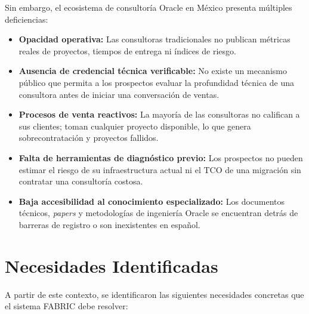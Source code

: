 \documentclass[12pt, a4paper, twoside]{report}
\begin{document}
Sin embargo, el ecosistema de consultoría Oracle en México presenta múltiples deficiencias:

\begin{itemize}
  \item \textbf{Opacidad operativa:} Las consultoras tradicionales no publican métricas reales
        de proyectos, tiempos de entrega ni índices de riesgo.

  \item \textbf{Ausencia de credencial técnica verificable:} No existe un mecanismo público que
        permita a los prospectos evaluar la profundidad técnica de una consultora antes de iniciar
        una conversación de ventas.

  \item \textbf{Procesos de venta reactivos:} La mayoría de las consultoras no califican a sus
        clientes; toman cualquier proyecto disponible, lo que genera sobrecontratación y proyectos
        fallidos.

  \item \textbf{Falta de herramientas de diagnóstico previo:} Los prospectos no pueden estimar
        el riesgo de su infraestructura actual ni el TCO de una migración sin contratar una
        consultoría costosa.

  \item \textbf{Baja accesibilidad al conocimiento especializado:} Los documentos técnicos,
        \textit{papers} y metodologías de ingeniería Oracle se encuentran detrás de barreras de
        registro o son inexistentes en español.
\end{itemize}

\section{Necesidades Identificadas}

A partir de este contexto, se identificaron las siguientes necesidades concretas que el sistema
FABRIC debe resolver:
\end{document}

